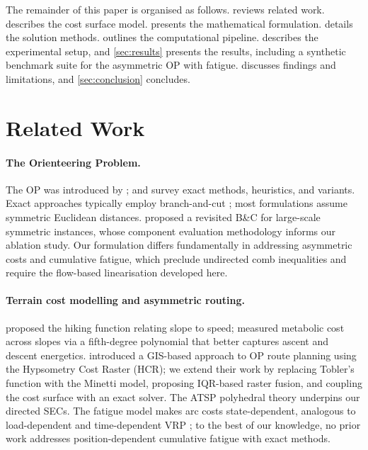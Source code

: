 \documentclass[preprint,11pt]{elsarticle}
\begin{document}
The remainder of this paper is organised as follows.
 reviews related work.
 describes the cost surface model.
 presents the mathematical formulation.
 details the solution methods.
 outlines the computational pipeline.
 describes the experimental setup, and \cref{sec:results} presents the results, including a synthetic benchmark suite for the asymmetric OP with fatigue.
 discusses findings and limitations, and \cref{sec:conclusion} concludes.

\section{Related Work}
\label{sec:related}

\paragraph{The Orienteering Problem.}
The OP was introduced by \citet{tsiligirides1984heuristic}; \citet{vansteenwegen2011orienteering} and \citet{gunawan2016orienteering} survey exact methods, heuristics, and variants.
Exact approaches typically employ branch-and-cut \citep{fischetti1998solving,gendreau1998generalized}; most formulations assume symmetric Euclidean distances.
\citet{kobeaga2021revisited} proposed a revisited B\&C for large-scale symmetric instances, whose component evaluation methodology informs our ablation study.
Our formulation differs fundamentally in addressing asymmetric costs and cumulative fatigue, which preclude undirected comb inequalities and require the flow-based linearisation developed here.

\paragraph{Terrain cost modelling and asymmetric routing.}
\citet{tobler1993} proposed the hiking function relating slope to speed; \citet{minetti2002} measured metabolic cost across slopes via a fifth-degree polynomial that better captures ascent and descent energetics.
\citet{ica2021lcp} introduced a GIS-based approach to OP route planning using the Hypsometry Cost Raster (HCR); we extend their work by replacing Tobler's function with the Minetti model, proposing IQR-based raster fusion, and coupling the cost surface with an exact solver.
The ATSP polyhedral theory \citep{fischetti1991atsp,fischetti1997atsp} underpins our directed SECs.
The fatigue model makes arc costs state-dependent, analogous to load-dependent \citep{bektas2011pollution} and time-dependent VRP \citep{malandraki1992timedep}; to the best of our knowledge, no prior work addresses position-dependent cumulative fatigue with exact methods.
\end{document}
